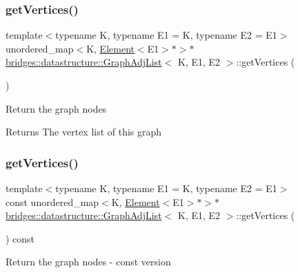 \subsubsection{\texorpdfstring{get\+Vertices()}{getVertices()}\hspace{0.1cm}{\footnotesize\ttfamily [1/2]}}
{\footnotesize\ttfamily template$<$typename K, typename E1 = K, typename E2 = E1$>$ \\
unordered\+\_\+map$<$K, \mbox{\hyperlink{classbridges_1_1datastructure_1_1_element}{Element}}$<$E1$>$$\ast$$>$$\ast$ \mbox{\hyperlink{classbridges_1_1datastructure_1_1_graph_adj_list}{bridges\+::datastructure\+::\+Graph\+Adj\+List}}$<$ K, E1, E2 $>$\+::get\+Vertices (\begin{DoxyParamCaption}{ }\end{DoxyParamCaption})\hspace{0.3cm}{\ttfamily [inline]}}

Return the graph nodes

\begin{DoxyReturn}{Returns}
The vertex list of this graph 
\end{DoxyReturn}
\mbox{\label{classbridges_1_1datastructure_1_1_graph_adj_list_a77b21cfdb87c4cf45ce29be6e7dd9791}} 
\subsubsection{\texorpdfstring{get\+Vertices()}{getVertices()}\hspace{0.1cm}{\footnotesize\ttfamily [2/2]}}
{\footnotesize\ttfamily template$<$typename K, typename E1 = K, typename E2 = E1$>$ \\
const unordered\+\_\+map$<$K, \mbox{\hyperlink{classbridges_1_1datastructure_1_1_element}{Element}}$<$E1$>$$\ast$$>$$\ast$ \mbox{\hyperlink{classbridges_1_1datastructure_1_1_graph_adj_list}{bridges\+::datastructure\+::\+Graph\+Adj\+List}}$<$ K, E1, E2 $>$\+::get\+Vertices (\begin{DoxyParamCaption}{ }\end{DoxyParamCaption}) const\hspace{0.3cm}{\ttfamily [inline]}}

Return the graph nodes -\/ const version

